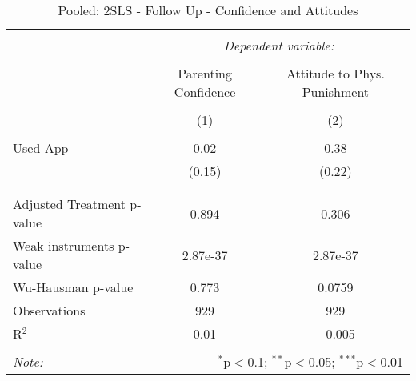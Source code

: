 
\begin{table}[!htbp] \centering 
  \caption{Pooled: 2SLS - Follow Up - Confidence and Attitudes} 
  \label{tbl:Pooled: 2SLS - Follow Up - Confidence and Attitudes} 
\begin{tabular}{@{\extracolsep{5pt}}lcc} 
\\[-1.8ex]\hline 
\hline \\[-1.8ex] 
 & \multicolumn{2}{c}{\textit{Dependent variable:}} \\ 
\cline{2-3} 
\\[-1.8ex] & Parenting Confidence & Attitude to Phys. Punishment \\ 
\\[-1.8ex] & (1) & (2)\\ 
\hline \\[-1.8ex] 
 Used App & 0.02 & 0.38 \\ 
  & (0.15) & (0.22) \\ 
  & & \\ 
\hline \\[-1.8ex] 
Adjusted Treatment p-value & 0.894 & 0.306 \\ 
Weak instruments p-value & 2.87e-37 & 2.87e-37 \\ 
Wu-Hausman p-value & 0.773 & 0.0759 \\ 
Observations & 929 & 929 \\ 
R$^{2}$ & 0.01 & $-$0.005 \\ 
\hline 
\hline \\[-1.8ex] 
\textit{Note:}  & \multicolumn{2}{r}{$^{*}$p$<$0.1; $^{**}$p$<$0.05; $^{***}$p$<$0.01} \\ 
\end{tabular} 
\end{table} 

